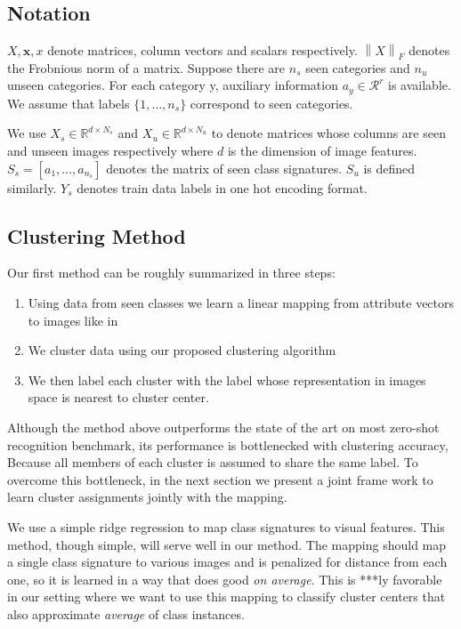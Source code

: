 \documentclass[wcp]{jmlr}
\newcommand{\norm}[1]{\left \lVert #1 \right \rVert_{F}}
\begin{document}
\subsection{Notation}
$X, \mathbf{x}, x$ denote matrices, column vectors and scalars respectively. $\norm{X}$ denotes the Frobnious norm of a matrix.
Suppose there are $n_s$ seen categories and $n_u$ unseen categories. For each category y,
auxiliary information $a_y \in \mathcal{R}^r$ is available. We assume that labels $\{1, \ldots, n_s \}$
correspond to seen categories.

We use $X_s \in \mathbb{R}^{d \times N_s}$ and $X_u \in \mathbb{R}^{d \times N_u}$
to denote matrices whose columns are seen and unseen images respectively where $d$ is the dimension of image features.
$S_s = [a_1, \ldots, a_{n_s}]$ denotes the matrix of seen class signatures. $S_u$ is defined similarly. $Y_s$
denotes train data labels in one hot encoding format.

\subsection{Clustering Method}
Our first method can be roughly summarized in three steps:
\begin{enumerate}
  \item Using data from seen classes we learn a linear mapping from  attribute vectors to images like in \cite{Kodirov2015}
  \item We cluster data using our proposed clustering algorithm
  \item We then label each cluster with the label whose representation in images space is nearest to cluster center.
\end{enumerate}
 Although the method above outperforms the state of the art on most zero-shot recognition benchmark,
its performance is bottlenecked with clustering accuracy, Because all members of each cluster is assumed to
share the same label. To overcome this bottleneck, in the next section we
present a joint frame work to learn cluster assignments jointly with the mapping.

We use a simple ridge regression to map class signatures to visual features. This method, though simple,
will serve well in our method. The mapping should map a single class signature to various images and is penalized
for distance from each one, so it is learned in a way that does good \textit{on average}. This is ***ly
favorable in our setting where we want to use this mapping to classify cluster centers that also
approximate \textit{average} of class instances.
\end{document}
